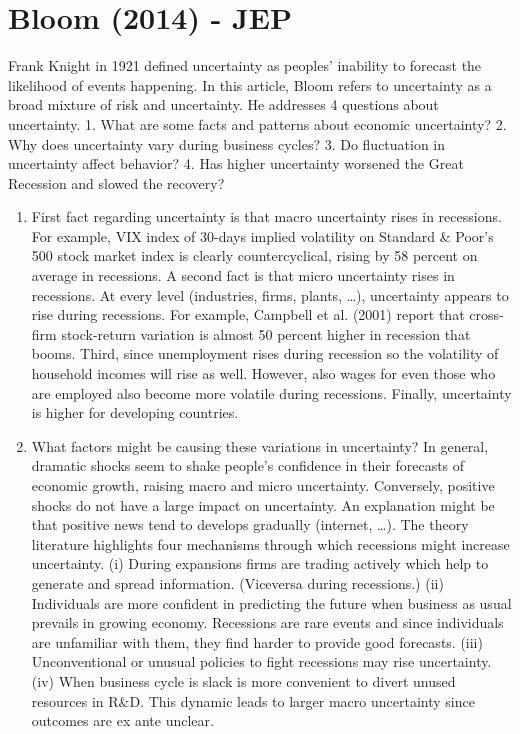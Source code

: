 \documentclass{article}
\begin{document}
{\section*{Bloom (2014) - JEP}

Frank Knight in 1921 defined uncertainty as peoples' inability to forecast the likelihood of events happening. In this article, Bloom refers to uncertainty as a broad mixture of risk and uncertainty. He addresses 4 questions about uncertainty. 1. What are some facts and patterns about economic uncertainty? 2. Why does uncertainty vary during business cycles? 3. Do fluctuation in uncertainty affect behavior? 4. Has higher uncertainty worsened the Great Recession and slowed the recovery?

\begin{enumerate}
	
	\item First fact regarding uncertainty is that macro uncertainty rises in recessions. For example, VIX index of 30-days implied volatility on Standard \& Poor's 500 stock market index is clearly countercyclical, rising by 58 percent on average in recessions. A second fact is that micro uncertainty rises in recessions. At every level (industries, firms, plants, \dots), uncertainty appears to rise during recessions. For example, Campbell et al. (2001) report that cross-firm stock-return variation is almost 50 percent higher in recession that booms. Third, since unemployment rises during recession so the volatility of household incomes will rise as well. However, also wages for even those who are employed also become more volatile during recessions. Finally, uncertainty is higher for developing countries.
	
	\item What factors might be causing these variations in uncertainty? In general, dramatic shocks seem to shake people's confidence in their forecasts of economic growth, raising macro and micro uncertainty. Conversely, positive shocks do not have a large impact on uncertainty. An explanation might be that positive news tend to develops gradually (internet, \dots). The theory literature highlights four mechanisms through which recessions might increase uncertainty. (i) During expansions firms are trading actively which help to generate and spread information. (Viceversa during recessions.) (ii) Individuals are more confident in predicting the future when business as usual prevails in growing economy. Recessions are rare events and since individuals are unfamiliar with them, they find harder to provide good forecasts. (iii) Unconventional or unusual policies to fight recessions may rise uncertainty. (iv) When business cycle is slack is more convenient to divert unused resources in R\&D. This dynamic leads to larger macro uncertainty since outcomes are ex ante unclear. 
	

\end{enumerate}}
\end{document}
